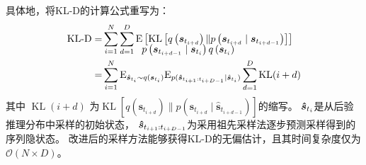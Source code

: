 具体地，将KL-D的计算公式重写为：
\begin{equation}
\begin{aligned}
\text{KL-D}=&\sum_{i=1}^{N}\sum_{d=1}^{D}\mathrm{E}\left[\operatorname{KL}\left[q\left(\boldsymbol{s}_{t_{i+d}} \right) \| p\left(\boldsymbol{s}_{t_{i+d}} \mid \boldsymbol{s}_{t_{i+d-1}}\right)\right]\right]\\[-15pt]
&\hspace{40pt}p\left(\boldsymbol{s}_{t_{i+d-1}} \mid\boldsymbol{s}_{t_{i}}\right){q\left(\boldsymbol{s}_{t_{i}} \right)}\\
=&\sum_{i=1}^{N}\mathrm{E}_{\hat{\boldsymbol{s}}_{t_i}\sim q(\boldsymbol{s}_{t_{i}})}\mathrm{E}_{p(\boldsymbol{\hat{s}}_{t_{i+1}:t_{i+D-1}}\mid \hat{\boldsymbol{s}}_{t_i})}\sum_{d=1}^{D}\operatorname{KL}(i+d)\\
\end{aligned}
\label{equ:reuse}
\end{equation}
其中 $\operatorname{KL}(i+d)$ 为$\operatorname{KL}\left[q\left(\boldsymbol{s}_{t_{i+d}} \right) \| p\left(\boldsymbol{s}_{t_{i+d}} \mid \boldsymbol{\hat s}_{t_{i+d-1}}\right)\right]$的缩写。
$\boldsymbol{\hat{s}}_{t_{i}}$是从后验推理分布中采样的初始状态，
$\boldsymbol{\hat{s}}_{t_{i+1}:t_{i+D-1}}$为采用祖先采样法逐步预测采样得到的序列隐状态。
改进后的采样方法能够获得KL-D的无偏估计，且其时间复杂度仅为$\mathcal{O}(N\times D)$。
